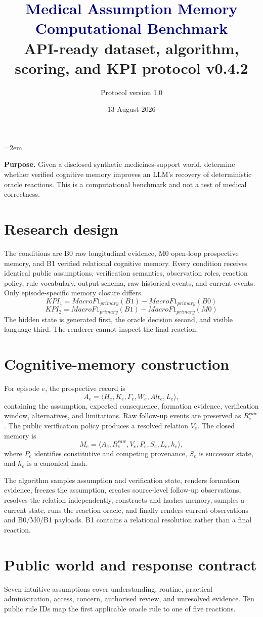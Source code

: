 \documentclass[10.5pt]{article}
\title{\vspace{-1.2cm}\textcolor{navy}{\Huge Medical Assumption Memory Computational Benchmark}\\[.25cm]\Large API-ready dataset, algorithm, scoring, and KPI protocol v0.4.2}
\author{Protocol version 1.0}\date{13 August 2026}
\begin{document}
\sloppy\emergencystretch=2em
\maketitle
\noindent\colorbox{pale}{\parbox{.96\linewidth}{\textbf{Purpose.} Given a disclosed synthetic medicines-support world, determine whether verified cognitive memory improves an LLM's recovery of deterministic oracle reactions. This is a computational benchmark and not a test of medical correctness.}}
\tableofcontents\newpage
\section{Research design}
The conditions are B0 raw longitudinal evidence, M0 open-loop prospective memory, and B1 verified relational cognitive memory. Every condition receives identical public assumptions, verification semantics, observation roles, reaction policy, rule vocabulary, output schema, raw historical events, and current events. Only episode-specific memory closure differs.
\[
KPI_1=MacroF1_{primary}(B1)-MacroF1_{primary}(B0)
\]
\[
KPI_2=MacroF1_{primary}(B1)-MacroF1_{primary}(M0)
\]
The hidden state is generated first, the oracle decision second, and visible language third. The renderer cannot inspect the final reaction.

\section{Cognitive-memory construction}
For episode $e$, the prospective record is
\[
A_e=\langle H_e,K_e,\Gamma_e,W_e,Alt_e,L_e\rangle,
\]
containing the assumption, expected consequence, formation evidence, verification window, alternatives, and limitations. Raw follow-up events are preserved as $R_e^{raw}$. The public verification policy produces a resolved relation $V_e$. The closed memory is
\[
M_e=\langle A_e,R_e^{raw},V_e,P_e,S_e,L_e,h_e\rangle,
\]
where $P_e$ identifies constitutive and competing provenance, $S_e$ is successor state, and $h_e$ is a canonical hash.

The algorithm samples assumption and verification state, renders formation evidence, freezes the assumption, creates source-level follow-up observations, resolves the relation independently, constructs and hashes memory, samples a current state, runs the reaction oracle, and finally renders current observations and B0/M0/B1 payloads. B1 contains a relational resolution rather than a final reaction.

\section{Public world and response contract}
Seven intuitive assumptions cover understanding, routine, practical administration, access, concern, authorised review, and unresolved evidence. Ten public rule IDs map the first applicable oracle rule to one of five reactions.
\end{document}

